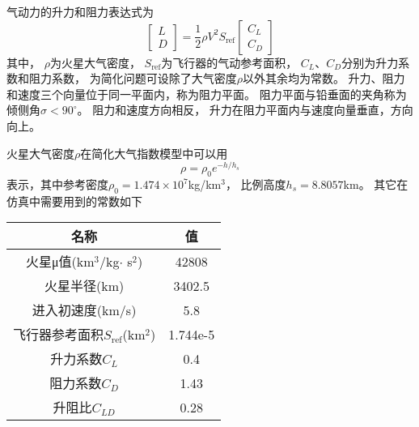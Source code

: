 气动力的升力和阻力表达式为
\begin{equation*}
    \left[\begin{matrix}
        L \\ D
    \end{matrix}\right]
    = \frac{1}{2}\rho V^2S_{\text{ref}}
    \left[\begin{matrix}
        C_L \\ C_D
    \end{matrix}\right]
\end{equation*}
其中，
$\rho$为火星大气密度，
$S_{\text{ref}}$为飞行器的气动参考面积，
$C_L$、$C_D$分别为升力系数和阻力系数，
为简化问题可设除了大气密度$\rho$以外其余均为常数。
升力、阻力和速度三个向量位于同一平面内，称为阻力平面。
阻力平面与铅垂面的夹角称为倾侧角$\sigma<90^{\circ}$。
阻力和速度方向相反，
升力在阻力平面内与速度向量垂直，方向向上。

火星大气密度$\rho$在简化大气指数模型中可以用
\[\rho=\rho_0e^{-h/h_s}\]
表示，其中参考密度$\rho_0=1.474\times10^7$kg/km$^3$，
比例高度$h_s=8.8057$km。
其它在仿真中需要用到的常数如下
\begin{tabular}{cc}
    \toprule
    名称 & 值 \\
    \midrule
    火星μ值(km$^3$/kg$\cdot$ s$^2$) & 42808 \\
    火星半径(km) & 3402.5 \\
    进入初速度(km/s) & 5.8 \\
    飞行器参考面积$S_\text{ref}$(km$^2$) & 1.744e-5 \\
    升力系数$C_L$ & 0.4 \\
    阻力系数$C_D$ & 1.43 \\
    升阻比$C_{LD}$ & 0.28 \\
    \bottomrule
\end{tabular}
